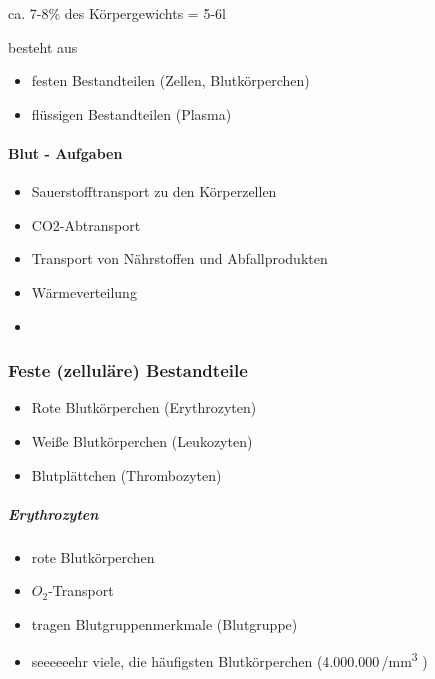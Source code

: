 ca. 7-8\% des K\"orpergewichts = 5-6l

besteht aus

\begin{itemize}
    \item festen Bestandteilen (Zellen, Blutk\"orperchen)
    \item flüssigen Bestandteilen (Plasma)
\end{itemize}



\paragraph{Blut - Aufgaben}

\begin{itemize}
    \item Sauerstofftransport zu den K\"orperzellen
    \item CO2-Abtransport
    \item Transport von N\"ahrstoffen und Abfallprodukten
    \item W\"armeverteilung
    \item {}
\end{itemize}


\subsubsection{Feste (zellul\"are) Bestandteile}

\begin{itemize}
    \item Rote Blutk\"orperchen (Erythrozyten)
    \item Wei{\ss}e Blutk\"orperchen (Leukozyten)
    \item Blutpl\"attchen (Thrombozyten)
\end{itemize}

\subparagraph{Erythrozyten}

\begin{itemize}
    \item rote Blutk\"orperchen
    \item $O_2$-Transport
    \item tragen Blutgruppenmerkmale (Blutgruppe)
    \item seeeeeehr viele, die h\"aufigsten Blutk\"orperchen
    (4.000.000\,/mm\textsuperscript{3} )
\end{itemize}

